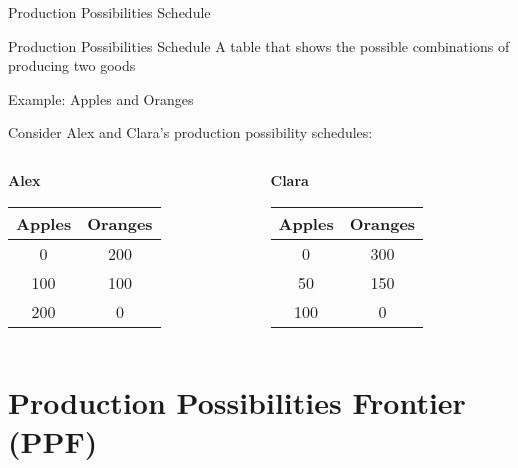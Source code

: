 \documentclass{beamer}
\begin{document}
\begin{frame}{Production Possibilities Schedule}

\begin{block}{Production Possibilities Schedule}
A table that shows the possible combinations of producing two goods 
\end{block}


\begin{exampleblock}{Example: Apples and Oranges}

Consider Alex and Clara's production possibility schedules:

\begin{columns}[T] %
\begin{column}{.48\textwidth}

\begin{center}
\textbf{Alex}

\begin{tabular}{ c  c }\hline
Apples & Oranges \\\hline
0 & 200 \\
100 & 100 \\
200 & 0 \\\hline
\end{tabular}

\end{center}
\end{column}%
\hfill%
\begin{column}{.48\textwidth}


\begin{center}

\textbf{Clara}

\begin{tabular}{ c  c }\hline
Apples & Oranges \\\hline
0 & 300 \\
50 & 150 \\
100 & 0 \\\hline
\end{tabular}

\end{center}

\end{column}%
\end{columns}

\end{exampleblock}
\end{frame}

\section{Production Possibilities Frontier (PPF)}
\end{document}
